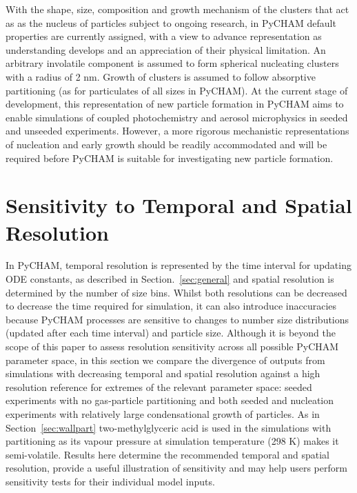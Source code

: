\documentclass[gmd, manuscript]{copernicus}
\begin{document}
With the shape, size, composition and growth mechanism of the clusters that act as as the nucleus of particles subject to ongoing research, in PyCHAM default properties are currently  assigned, with a view to advance representation as understanding develops and an appreciation of their physical limitation.  An arbitrary involatile component is assumed to form spherical nucleating clusters with a radius of 2 nm.  Growth of clusters is assumed to follow absorptive partitioning (as for particulates of all sizes in PyCHAM).  At the current stage of development, this representation of new particle formation in PyCHAM aims to enable simulations of coupled photochemistry and aerosol microphysics in seeded and unseeded experiments.  However, a more rigorous mechanistic representations of nucleation and early growth should be readily accommodated and will be required before PyCHAM is suitable for investigating new particle formation.

\section{Sensitivity to Temporal and Spatial Resolution}\label{sec:tr_tests}

In PyCHAM, temporal resolution is represented by the time interval for updating ODE constants, as described in Section.~\ref{sec:general} and spatial resolution is determined by the number of size bins.  Whilst both resolutions can be decreased to decrease the time required for simulation, it can also introduce inaccuracies because PyCHAM processes are sensitive to changes to number size distributions (updated after each time interval) and particle size.  Although it is beyond the scope of this paper to assess resolution sensitivity across all possible PyCHAM parameter space, in this section we compare the divergence of outputs from simulations with decreasing temporal and spatial resolution against a high resolution reference for extremes of the relevant parameter space: seeded experiments with no gas-particle partitioning and both seeded and nucleation experiments with relatively large condensational growth of particles.  As in Section~\ref{sec:wallpart} two-methylglyceric acid is used in the simulations with partitioning as its vapour pressure at simulation temperature (298 K) makes it semi-volatile.  Results here determine the recommended temporal and spatial resolution, provide a useful illustration of sensitivity and may help users perform sensitivity tests for their individual model inputs.
\end{document}
